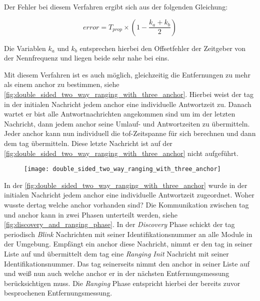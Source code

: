 Der Fehler bei diesem Verfahren ergibt sich aus der folgenden Gleichung:

\begin{equation}
error=T_{prop}\times\left(1-\frac{k_a+k_b}{2}\right)
\end{equation}

Die Variablen $k_a$ und $k_b$ entsprechen hierbei den Offsetfehler der Zeitgeber von der Nennfrequenz und liegen beide sehr nahe bei eins.

Mit diesem Verfahren ist es auch möglich, gleichzeitig die Entfernungen zu mehr als einem \Gls{anchor} zu bestimmen, siehe \autoref{fig:double_sided_two_way_ranging_with_three_anchor}. Hierbei weist der \Gls{tag} in der initialen Nachricht jedem \Gls{anchor} eine individuelle Antwortzeit zu. Danach wartet er bist alle Antwortnachrichten angekommen sind um im der letzten Nachricht, dann jedem \Gls{anchor} seine Umlauf- und Antwortzeiten zu übermitteln. Jeder \Gls{anchor} kann nun individuell die \Gls{tof}-Zeitspanne für sich berechnen und dann dem \Gls{tag} übermitteln. Diese letzte Nachricht ist auf der \autoref{fig:double_sided_two_way_ranging_with_three_anchor} nicht aufgeführt.

\begin{figure}
	\centering
	\texttt{[image: double\_sided\_two\_way\_ranging\_with\_three\_anchor]}
	\label{fig:double_sided_two_way_ranging_with_three_anchor}
\end{figure}

In der \autoref{fig:double_sided_two_way_ranging_with_three_anchor} wurde in der initialen Nachricht jedem \Gls{anchor} eine individuelle Antwortzeit zugeordnet. Woher wusste der\Gls{tag} welche \Gls{anchor} vorhanden sind? Die Kommunikation zwischen \Gls{tag} und \Gls{anchor} kann in zwei Phasen unterteilt werden, siehe \autoref{fig:discovery_and_ranging_phase}. In der \textit{Discovery} Phase schickt der \Gls{tag} periodisch \textit{Blink} Nachrichten mit seiner Identifikationsnummer an alle Module in der Umgebung. Empfängt ein \Gls{anchor} diese Nachricht, nimmt er den \Gls{tag} in seiner Liste auf und übermittelt dem \Gls{tag} eine \textit{Ranging Init} Nachricht mit seiner Identifikationsnummer. Das \Gls{tag} seinerseits nimmt den \Gls{anchor} in seiner Liste auf und weiß nun auch welche \Gls{anchor} er in der nächsten Entfernungsmessung berücksichtigen muss. Die \textit{Ranging} Phase entspricht hierbei der bereits zuvor besprochenen Entfernungsmessung.


